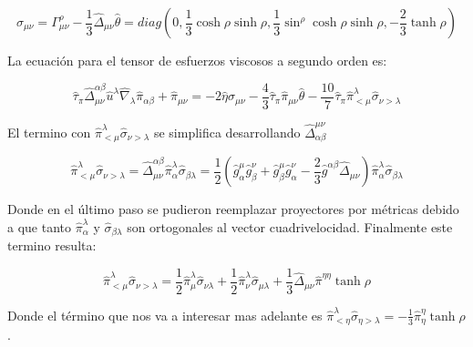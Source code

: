 \documentclass[11pt,a4paper]{article}
\begin{document}
\begin{equation}
\sigma_{{\mu}{\nu}}=\Gamma^{\rho}_{{\mu}{\nu}}-\frac{1}{3}\hat{\Delta}_{{\mu}{\nu}}\hat{\theta}= diag(0,\frac{1}{3}\cosh\rho\sinh\rho,\frac{1}{3}\sin^\rho\cosh\rho\sinh\rho,-\frac{2}{3}\tanh\rho)
\label{esfuerzp_de_corte}
\end{equation}

La ecuación para el tensor de esfuerzos viscosos a segundo orden es:

\begin{equation}
\hat{\tau}_{\pi}\hat{\Delta}^{{\alpha}{\beta}}_{{\mu}{\nu}}\hat{u}^{\lambda}\hat{\nabla}_{\lambda}\hat{\pi}_{{\alpha}{\beta}}+\hat{\pi}_{{\mu}{\nu}}=-2\hat{\eta}\hat{\sigma}_{{\mu}{\nu}}-\frac{4}{3}\hat{\tau}_{\pi}\hat{\pi}_{{\mu}{\nu}}\hat{\theta}-\frac{10}{7}\hat{\tau}_{\pi}\hat{\pi}^{\lambda}_{<\mu}\hat{\sigma}_{{\nu>}{\lambda}}
\label{shear_segundo_orden}
\end{equation}

El termino con $\hat{\pi}^{\lambda}_{<\mu}\hat{\sigma}_{{\nu>}{\lambda}}$ se simplifica desarrollando $\hat{\Delta}^{{\mu}{\nu}}_{{\alpha}{\beta}}$

\begin{equation}
\hat{\pi}^{\lambda}_{<\mu}\hat{\sigma}_{{\nu>}{\lambda}}=\hat{\Delta}^{{\alpha}{\beta}}_{{\mu}{\nu}}\hat{\pi}^{\lambda}_{\alpha}\hat{\sigma}_{{\beta}{\lambda}}=
\frac{1}{2}(\hat{g}^{\mu}_{\alpha}\hat{g}^{\nu}_{\beta}+\hat{g}^{\mu}_{\beta}\hat{g}^{\nu}_{\alpha}-\frac{2}{3}\hat{g}^{{\alpha}{\beta}}\hat{\Delta}_{{\mu}{\nu}})\hat{\pi}^{\lambda}_{\alpha}\hat{\sigma}_{{\beta}{\lambda}}
\end{equation}

Donde en el último paso se pudieron reemplazar proyectores por métricas debido a que tanto $\hat{\pi}^{\lambda}_{\alpha}$ y $\hat{\sigma}_{{\beta}{\lambda}}$ son ortogonales al vector cuadrivelocidad. Finalmente este termino resulta:

\begin{equation}
\hat{\pi}^{\lambda}_{<\mu}\hat{\sigma}_{{\nu>}{\lambda}}=
\frac{1}{2}\hat{\pi}^{\lambda}_{\mu}\hat{\sigma}_{{\nu}{\lambda}}
+\frac{1}{2}\hat{\pi}^{\lambda}_{\nu}\hat{\sigma}_{{\mu}{\lambda}}
+\frac{1}{3}\hat{\Delta}_{{\mu}{\nu}}\hat{\pi}^{{\eta}{\eta}}\tanh\rho
\end{equation}

Donde el término que nos va a interesar mas adelante es $\hat{\pi}^{\lambda}_{<\eta}\hat{\sigma}_{{\eta>}{\lambda}}=-\frac{1}{3}\hat{\pi}^{\eta}_{\eta}\tanh\rho$.
\end{document}
